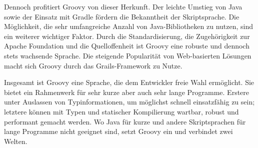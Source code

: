 \documentclass[a4paper]{article}
\begin{document}
Dennoch profitiert Groovy von dieser Herkunft.
Der leichte Umstieg von Java sowie der Einsatz mit Gradle fördern die Bekanntheit der Skriptsprache.
Die Möglichkeit, die sehr umfangreiche Anzahl von Java-Bibliotheken zu nutzen, sind ein weiterer wichtiger Faktor.
Durch die Standardisierung, die Zugehörigkeit zur Apache Foundation und die Quelloffenheit ist Groovy eine robuste und dennoch stets wachsende Sprache.
Die steigende Popularität von Web-basierten Lösungen macht sich Groovy durch das Grails-Framework zu Nutze.

Insgesamt ist Groovy eine Sprache, die dem Entwickler freie Wahl ermöglicht.
Sie bietet ein Rahmenwerk für sehr kurze aber auch sehr lange Programme.
Erstere unter Auslassen von Typinformationen, um möglichst schnell einsatzfähig zu sein;
letztere können mit Typen und statischer Kompilierung wartbar, robust und performant gemacht werden.
Wo Java für kurze und andere Skriptsprachen für lange Programme nicht geeignet sind, setzt Groovy ein und verbindet zwei Welten.



\begingroup
	\linespread{0}\selectfont %
	
\endgroup

\end{document}
